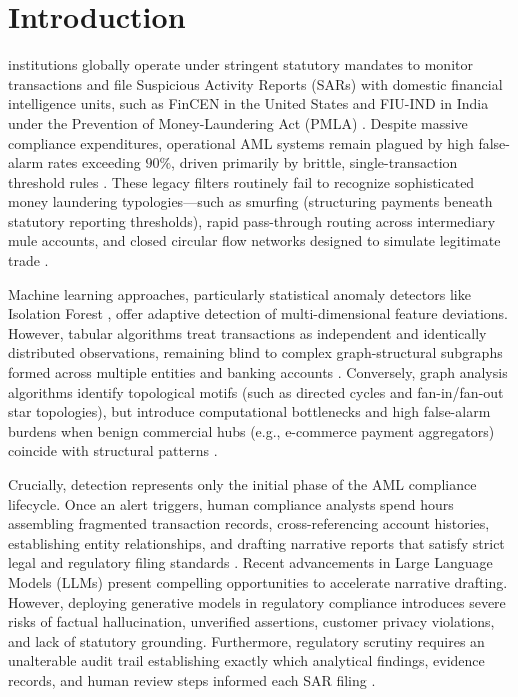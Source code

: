 \documentclass[10pt,journal,compsoc]{IEEEtran}
\begin{document}
\maketitle
\IEEEdisplaynontitleabstractindextext
\IEEEpeerreviewmaketitle

\section{Introduction}
 institutions globally operate under stringent statutory mandates to monitor transactions and file Suspicious Activity Reports (SARs) with domestic financial intelligence units, such as FinCEN in the United States and FIU-IND in India under the Prevention of Money-Laundering Act (PMLA) \cite{fatf2012guidance, fincen2020sar, pmla2002act}. Despite massive compliance expenditures, operational AML systems remain plagued by high false-alarm rates exceeding $90\%$, driven primarily by brittle, single-transaction threshold rules \cite{chen2023machine}. These legacy filters routinely fail to recognize sophisticated money laundering typologies---such as smurfing (structuring payments beneath statutory reporting thresholds), rapid pass-through routing across intermediary mule accounts, and closed circular flow networks designed to simulate legitimate trade \cite{jullum2020detecting}.

Machine learning approaches, particularly statistical anomaly detectors like Isolation Forest \cite{liu2008isolation}, offer adaptive detection of multi-dimensional feature deviations. However, tabular algorithms treat transactions as independent and identically distributed observations, remaining blind to complex graph-structural subgraphs formed across multiple entities and banking accounts \cite{weber2019anti}. Conversely, graph analysis algorithms identify topological motifs (such as directed cycles and fan-in/fan-out star topologies), but introduce computational bottlenecks and high false-alarm burdens when benign commercial hubs (e.g., e-commerce payment aggregators) coincide with structural patterns \cite{hagberg2008exploring}.

Crucially, detection represents only the initial phase of the AML compliance lifecycle. Once an alert triggers, human compliance analysts spend hours assembling fragmented transaction records, cross-referencing account histories, establishing entity relationships, and drafting narrative reports that satisfy strict legal and regulatory filing standards \cite{fincen2020sar}. Recent advancements in Large Language Models (LLMs) present compelling opportunities to accelerate narrative drafting. However, deploying generative models in regulatory compliance introduces severe risks of factual hallucination, unverified assertions, customer privacy violations, and lack of statutory grounding. Furthermore, regulatory scrutiny requires an unalterable audit trail establishing exactly which analytical findings, evidence records, and human review steps informed each SAR filing \cite{crosby2009efficient, haber1991time}.
\end{document}

